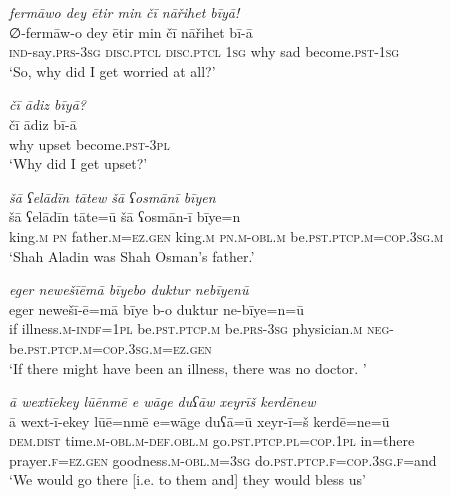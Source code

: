 \ea \label{PM.49}
\textit{fermāwo dey ētir min čī nāřihet bīyā!} \\ 
\gll ∅-fermāw-o dey ētir min čī nāřihet bī-ā \\ 
 \textsc{ind-}say\textsc{.prs}\textsc{-3sg} \textsc{disc.ptcl} \textsc{disc.ptcl} \textsc{1sg} why sad become\textsc{.pst}\textsc{-\textsc{1sg}} \\ 
\glt `So, why did I get worried at all?'
\z 
 
\ea \label{PM.50}
\textit{čī ādiz bīyā?} \\ 
\gll čī ādiz bī-ā \\ 
 why upset become\textsc{.pst}\textsc{-3pl} \\ 
\glt `Why did I get upset?'
\z 
 
\ea \label{DG.2}
\textit{šā ʕelādīn tātew šā ʕosmānī bīyen} \\ 
\gll šā ʕelādīn tāte=ū šā ʕosmān-ī bīye=n \\ 
 king\textsc{.m} \textsc{pn} father\textsc{.m}\textsc{=ez}\textsc{.gen} king\textsc{.m} \textsc{pn}\textsc{.m}\textsc{-obl}\textsc{.m} be\textsc{.pst}\textsc{.ptcp}\textsc{.m}\textsc{=cop}\textsc{.3sg}\textsc{.m} \\ 
\glt `Shah Aladin was Shah Osman’s father.'
\z 
 
\ea \label{DG.5}
\textit{eger newešīēmā bīyebo duktur nebīyenū} \\ 
\gll eger newešī-ē=mā bīye b-o duktur ne-bīye=n=ū \\ 
 if illness\textsc{.m}\textsc{-indf}\textsc{=1pl} be\textsc{.pst}\textsc{.ptcp}\textsc{.m} be\textsc{.prs}\textsc{-3sg} physician\textsc{.m} \textsc{neg-}be\textsc{.pst}\textsc{.ptcp}\textsc{.m}\textsc{=cop}\textsc{.3sg}\textsc{.m}\textsc{=ez}\textsc{.gen} \\ 
\glt `If there might have been an illness, there was no doctor. '
\z 
 
\ea \label{DG.6}
\textit{ā wextīekey lūēnmē e wāge duʕāw xeyrīš kerdēnew} \\ 
\gll ā wext-ī-ekey lūē=nmē e=wāge duʕā=ū xeyr-ī=š kerdē=ne=ū \\ 
 \textsc{dem.dist} time\textsc{.m}\textsc{-obl}\textsc{.m}\textsc{-def}\textsc{.obl}\textsc{.m} go\textsc{.pst}\textsc{.ptcp}\textsc{.pl}\textsc{=cop}\textsc{.1pl} in=there prayer\textsc{\textsc{.f}}\textsc{=ez}\textsc{.gen} goodness\textsc{.m}\textsc{-obl}\textsc{.m}\textsc{=3sg} do\textsc{.pst}\textsc{.ptcp}\textsc{\textsc{.f}}\textsc{=cop}\textsc{.3sg}\textsc{\textsc{.f}}=and \\ 
\glt `We would go there [i.e. to them and] they would bless us'
\z 
 
